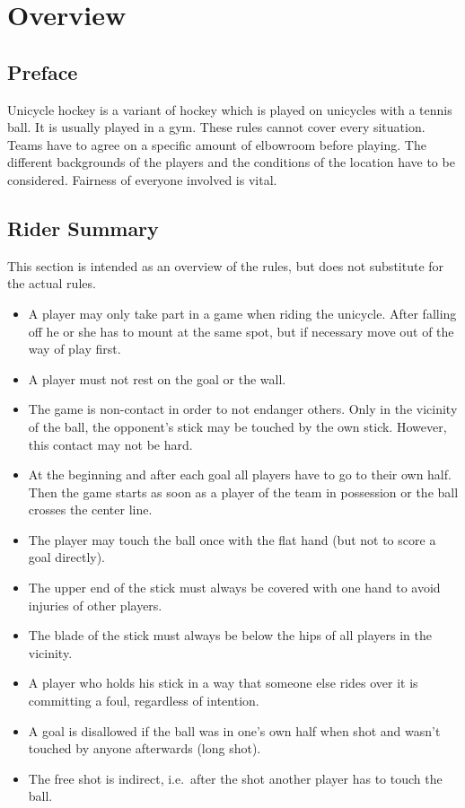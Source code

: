 \chapter{Overview}

\section{Preface}

Unicycle hockey is a variant of hockey which is played on unicycles with a tennis ball.
It is usually played in a gym.
These rules cannot cover every situation.
Teams have to agree on a specific amount of elbowroom before playing.
The different backgrounds of the players and the conditions of the location have to be considered.
Fairness of everyone involved is vital.

\section{Rider Summary}

This section is intended as an overview of the rules, but does not substitute for the actual rules.
\begin{itemize}
\item A player may only take part in a game when riding the unicycle.
 After falling off he or she has to mount at the same spot, but if necessary move out of the way of play first.
\item A player must not rest on the goal or the wall.
\item The game is non-contact in order to not endanger others.
  Only in the vicinity of the ball, the opponent's stick may be touched by the own stick.
  However, this contact may not be hard.
\item At the beginning and after each goal all players have to go to their own half.
  Then the game starts as soon as a player of the team in possession or the ball crosses the center line.
\item The player may touch the ball once with the flat hand (but not to score a goal directly).
\item The upper end of the stick must always be covered with one hand to avoid injuries of other players.
\item The blade of the stick must always be below the hips of all players in the vicinity.
\item A player who holds his stick in a way that someone else rides over it is committing a foul, regardless of intention.
\item A goal is disallowed if the ball was in one's own half when shot and wasn't touched by anyone afterwards (long shot).
\item The free shot is indirect, i.e.\ after the shot another player has to touch the ball.
\end{itemize}
